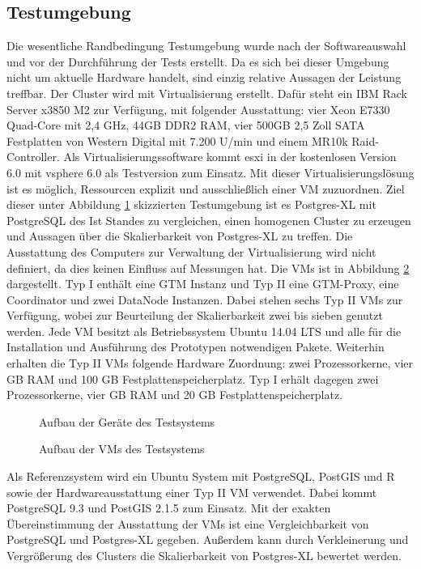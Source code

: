 \subsection{Testumgebung}
Die wesentliche Randbedingung Testumgebung wurde nach der Softwareauswahl und vor der Durchführung der Tests erstellt.
Da es sich bei dieser Umgebung nicht um aktuelle Hardware handelt, sind einzig relative Aussagen der Leistung treffbar.
Der Cluster wird mit Virtualisierung erstellt.
Dafür steht ein IBM Rack Server x3850 M2 zur Verfügung, mit folgender Ausstattung:
vier Xeon E7330 Quad-Core mit 2,4 GHz, 44GB DDR2 RAM, vier 500GB 2,5 Zoll SATA Festplatten von Western Digital mit 7.200 U/min und einem MR10k Raid-Controller.
Als Virtualisierungssoftware kommt \Gls{esxi} in der kostenlosen Version 6.0 mit \Gls{vsphere} 6.0 als Testversion zum Einsatz.
Mit dieser Virtualisierungslösung ist es möglich, Ressourcen explizit und ausschließlich einer VM zuzuordnen.
Ziel dieser unter Abbildung \ref{fig:physAufb} skizzierten Testumgebung ist es Postgres-XL mit PostgreSQL des Ist Standes zu vergleichen, einen homogenen Cluster zu erzeugen und Aussagen über die Skalierbarkeit von Postgres-XL zu treffen.
Die Ausstattung des Computers zur Verwaltung der Virtualisierung wird nicht definiert, da dies keinen Einfluss auf Messungen hat.
Die VMs ist in Abbildung \ref{fig:VMAufb} dargestellt.
Typ I enthält eine GTM Instanz und Typ II eine GTM-Proxy, eine Coordinator und zwei DataNode Instanzen.
Dabei stehen sechs Typ II VMs zur Verfügung, wobei zur Beurteilung der Skalierbarkeit zwei bis sieben genutzt werden.
Jede VM besitzt als Betriebssystem Ubuntu 14.04 LTS und alle für die Installation und Ausführung des Prototypen notwendigen Pakete.
Weiterhin erhalten die Typ II VMs folgende Hardware Zuordnung:
zwei Prozessorkerne, vier GB RAM und 100 GB Festplattenspeicherplatz.
Typ I erhält dagegen zwei Prozessorkerne, vier GB RAM und 20 GB Festplattenspeicherplatz.
\begin{figure}[h!]
\centering

\caption[Aufbau der Geräte des Testsystems]{Aufbau der Geräte des Testsystems}
\label{fig:physAufb}
\end{figure}
\begin{figure}[h!]
\centering

\caption[Aufbau der VMs des Testsystems]{Aufbau der VMs des Testsystems}
\label{fig:VMAufb}
\end{figure}

Als Referenzsystem wird ein Ubuntu System mit PostgreSQL, PostGIS und R sowie der Hardwareausstattung einer Typ II VM verwendet.
Dabei kommt PostgreSQL 9.3 und PostGIS 2.1.5 zum Einsatz.
Mit der exakten Übereinstimmung der Ausstattung der VMs ist eine Vergleichbarkeit von PostgreSQL und Postgres-XL gegeben.
Außerdem kann durch Verkleinerung und Vergrößerung des Clusters die Skalierbarkeit von Postgres-XL bewertet werden.

